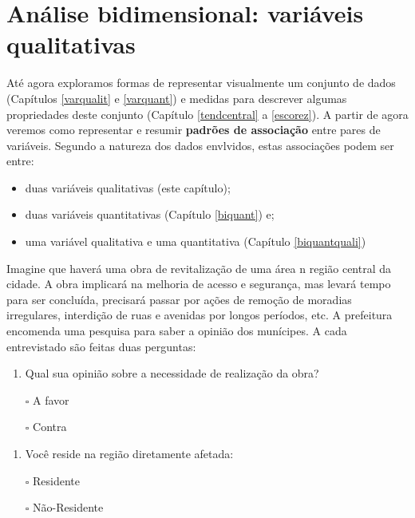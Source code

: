 \documentclass[
]{book}
\providecommand{\tightlist}{%
  \setlength{\itemsep}{0pt}\setlength{\parskip}{0pt}}
\begin{document}
\hypertarget{biquali}{%
\chapter{Análise bidimensional: variáveis qualitativas}\label{biquali}}

Até agora exploramos formas de representar visualmente um conjunto de dados (Capítulos \ref{varqualit} e \ref{varquant}) e medidas para descrever algumas propriedades deste conjunto (Capítulo \ref{tendcentral} a \ref{escorez}). A partir de agora veremos como representar e resumir \textbf{padrões de associação} entre pares de variáveis. Segundo a natureza dos dados envlvidos, estas associações podem ser entre:

\begin{itemize}
\item
  duas variáveis qualitativas (este capítulo);
\item
  duas variáveis quantitativas (Capítulo \ref{biquant}) e;
\item
  uma variável qualitativa e uma quantitativa (Capítulo \ref{biquantquali})
\end{itemize}

Imagine que haverá uma obra de revitalização de uma área n região central da cidade. A obra implicará na melhoria de acesso e segurança, mas levará tempo para ser concluída, precisará passar por ações de remoção de moradias irregulares, interdição de ruas e avenidas por longos períodos, etc. A prefeitura encomenda uma pesquisa para saber a opinião dos munícipes. A cada entrevistado são feitas duas perguntas:

\begin{enumerate}
\def\labelenumi{\arabic{enumi}.}
\tightlist
\item
  Qual sua opinião sobre a necessidade de realização da obra?
\end{enumerate}

\begin{itemize}
\tightlist
\item[$\square$]
  A favor
\item[$\square$]
  Contra
\end{itemize}

\begin{enumerate}
\def\labelenumi{\arabic{enumi}.}
\setcounter{enumi}{1}
\tightlist
\item
  Você reside na região diretamente afetada:
\end{enumerate}

\begin{itemize}
\tightlist
\item[$\square$]
  Residente
\item[$\square$]
  Não-Residente
\end{itemize}
\end{document}
